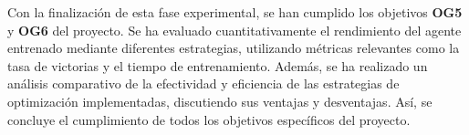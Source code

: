 Con la finalización de esta fase experimental, se han cumplido los objetivos \textbf{OG5} y \textbf{OG6} del proyecto. Se ha evaluado cuantitativamente el rendimiento del agente entrenado mediante diferentes estrategias, utilizando métricas relevantes como la tasa de victorias y el tiempo de entrenamiento. Además, se ha realizado un análisis comparativo de la efectividad y eficiencia de las estrategias de optimización implementadas, discutiendo sus ventajas y desventajas. Así, se concluye el cumplimiento de todos los objetivos específicos del proyecto.